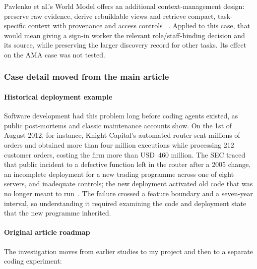 Pavlenko et al.'s World Model offers an additional context-management
design: preserve raw evidence, derive rebuildable views and retrieve compact,
task-specific context with provenance and access controls
~\cite{pavlenko2026factory}. Applied to this case, that would mean giving
a sign-in worker the relevant role/staff-binding decision and its source,
while preserving the larger discovery record for other tasks.
Its effect on the AMA case was not tested.


\subsubsection{Case detail moved from the main article}

\paragraph{Historical deployment example}
Software development had this problem long before coding agents existed, as
public post-mortems and classic maintenance accounts show. On the 1st of
August 2012, for instance, Knight Capital's automated router sent millions
of orders and obtained more than four million executions while processing
212 customer orders, costing the firm more than USD~460 million. The SEC
traced that public incident to a defective function left in the router after
a 2005 change, an incomplete deployment for a new trading programme across
one of eight servers, and inadequate controls; the new deployment activated
old code that was no longer meant to run~\cite{sec2013knight}. The failure
crossed a feature boundary and a seven-year interval, so understanding it
required examining the code and deployment state that the new programme
inherited.

\paragraph{Original article roadmap}
\noindent The investigation moves from earlier studies to my project and
then to a separate coding experiment:

